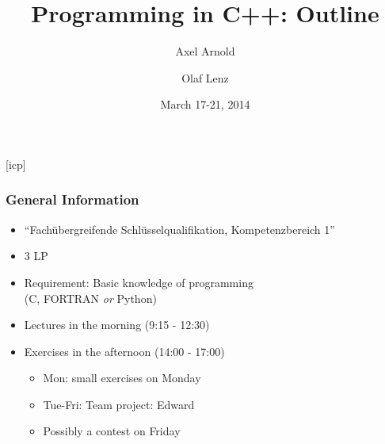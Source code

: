 \documentclass{slides}
\begin{document}
\newcommand{\ie}{\textit{i.\thinspace e.}\xspace}
\newcommand{\eg}{\textit{e.\thinspace g.}\xspace}

\graphicspath{{figures/}}

\title[Programming in C++: Outline]{\Large Programming in C++: Outline}

\author[A. Arnold and O. Lenz]{Axel Arnold \and Olaf Lenz} 
\date{March 17-21, 2014}

\begin{frame}
  \titlepage
\end {frame}
[icp]

\begin{frame}
  \frametitle{General Information}
  \begin{itemize}
  \item ``Fachübergreifende Schlüsselqualifikation, Kompetenzbereich 1''
  \item 3 LP
  \item Requirement: Basic knowledge of programming\\ (C, FORTRAN \emph{or} Python)
  \item Lectures in the morning (9:15 - 12:30)
  \item Exercises in the afternoon (14:00 - 17:00)
    \begin{itemize}
    \item Mon: small exercises on Monday
    \item Tue-Fri: Team project: Edward
    \item Possibly a contest on Friday
    \end{itemize}
  \end{itemize}
\end{frame}
\end{document}

